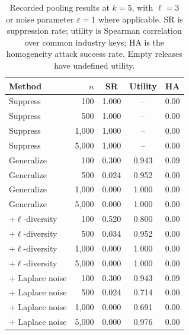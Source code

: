 \begin{table}[htbp]\centering\small
\caption{Recorded pooling results at $k=5$, with $\ell=3$ or noise parameter $\varepsilon=1$ where applicable. SR is suppression rate; utility is Spearman correlation over common industry keys; HA is the homogeneity attack success rate. Empty releases have undefined utility.}
\label{tab:privacy-summary}
\begin{tabular}{@{}lrccc@{}}\toprule
Method & $n$ & SR & Utility & HA \\\midrule
Suppress & 100 & 1.000 & -- & 0.00 \\
Suppress & 500 & 1.000 & -- & 0.00 \\
Suppress & 1,000 & 1.000 & -- & 0.00 \\
Suppress & 5,000 & 1.000 & -- & 0.00 \\
\midrule
Generalize & 100 & 0.300 & 0.943 & 0.09 \\
Generalize & 500 & 0.024 & 0.952 & 0.00 \\
Generalize & 1,000 & 0.000 & 1.000 & 0.00 \\
Generalize & 5,000 & 0.000 & 1.000 & 0.00 \\
\midrule
$+\ell$-diversity & 100 & 0.520 & 0.800 & 0.00 \\
$+\ell$-diversity & 500 & 0.034 & 0.952 & 0.00 \\
$+\ell$-diversity & 1,000 & 0.000 & 1.000 & 0.00 \\
$+\ell$-diversity & 5,000 & 0.000 & 1.000 & 0.00 \\
\midrule
$+$ Laplace noise & 100 & 0.300 & 0.943 & 0.09 \\
$+$ Laplace noise & 500 & 0.024 & 0.714 & 0.00 \\
$+$ Laplace noise & 1,000 & 0.000 & 0.691 & 0.00 \\
$+$ Laplace noise & 5,000 & 0.000 & 0.976 & 0.00 \\
\bottomrule\end{tabular}\end{table}
